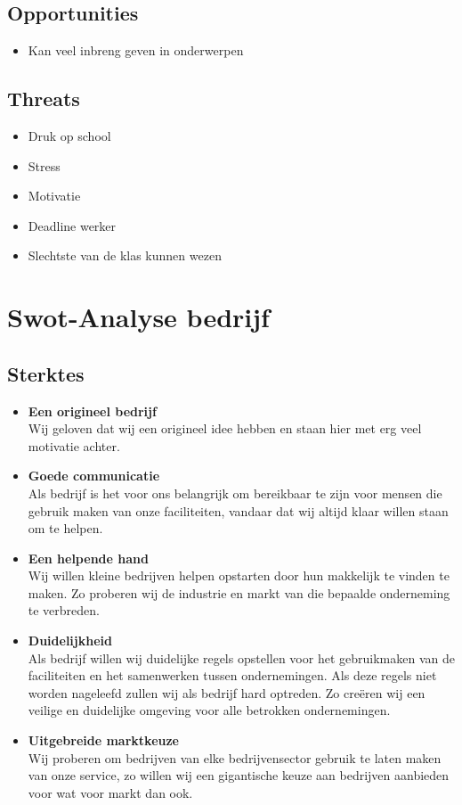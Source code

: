 \documentclass[11pt,oneside,a4paper,numbers=enddot]{report} %
\begin{document}
\subsection{Opportunities}
\begin{itemize}
\item
  Kan veel inbreng geven in onderwerpen
\end{itemize}

\subsection{Threats}
\begin{itemize}
\item
  Druk op school
\item
  Stress
\item
  Motivatie
\item
  Deadline werker
\item
  Slechtste van de klas kunnen wezen
\end{itemize}

\section{Swot-Analyse bedrijf}

\subsection{Sterktes}
\begin{itemize}
\item {\bf Een origineel bedrijf} \\
  Wij geloven dat wij een origineel idee hebben en staan hier met erg veel motivatie achter.
\item {\bf Goede communicatie} \\
  Als bedrijf is het voor ons belangrijk om bereikbaar te zijn voor mensen die gebruik maken van onze faciliteiten, vandaar dat wij altijd klaar willen staan om te helpen.
\item {\bf Een helpende hand} \\
  Wij willen kleine bedrijven helpen opstarten door hun makkelijk te vinden te maken. Zo proberen wij de industrie en markt van die bepaalde onderneming te verbreden.
\item {\bf Duidelijkheid} \\
  Als bedrijf willen wij duidelijke regels opstellen voor het gebruikmaken van de faciliteiten en het samenwerken tussen ondernemingen. Als deze regels niet worden nageleefd zullen wij als bedrijf hard optreden. Zo creëren wij een veilige en duidelijke omgeving voor alle betrokken ondernemingen.
\item {\bf Uitgebreide marktkeuze} \\
  Wij proberen om bedrijven van elke bedrijvensector gebruik te laten maken van onze service, zo willen wij een gigantische keuze aan bedrijven aanbieden voor wat voor markt dan ook.
\end{itemize}
\end{document}
